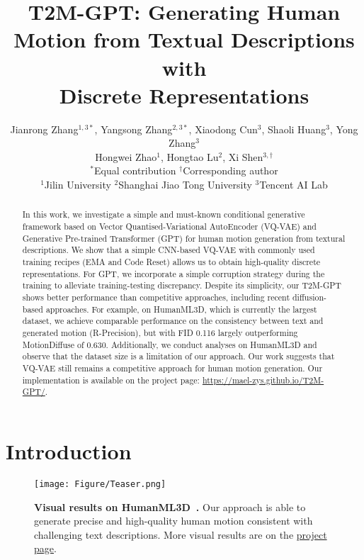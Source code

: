 \documentclass[10pt,twocolumn,letterpaper]{article}
\begin{document}
\title{T2M-GPT: Generating Human Motion from Textual Descriptions with \\ Discrete Representations}

\author{Jianrong Zhang$^{1,3*}$, 
Yangsong Zhang$^{2,3*}$, 
Xiaodong Cun$^3$, Shaoli Huang$^3$, Yong Zhang$^3$ \\ Hongwei Zhao$^1$, Hongtao Lu$^2$, Xi Shen$^{3,\dagger}$ \\
\small $^{*}$Equal contribution \qquad $^{\dagger}$Corresponding author \\[2mm]
$^1$Jilin University \qquad
$^2$Shanghai Jiao Tong University \qquad $^3$Tencent AI Lab\\
}
\maketitle

\begin{abstract}
In this work, we investigate a simple and must-known conditional generative framework based on Vector Quantised-Variational AutoEncoder (VQ-VAE) and Generative Pre-trained Transformer (GPT) for human motion generation from textural descriptions. We show that a simple CNN-based VQ-VAE with commonly used training recipes (EMA and Code Reset) allows us to obtain high-quality discrete representations. For GPT, we incorporate a simple corruption strategy during the training to alleviate training-testing discrepancy. Despite its simplicity, our T2M-GPT shows better performance than competitive approaches, including recent diffusion-based approaches. For example, on HumanML3D, which is currently the largest dataset, we achieve comparable performance on the consistency between text and generated motion (R-Precision), but with FID 0.116 largely outperforming MotionDiffuse of 0.630. Additionally, we conduct analyses on HumanML3D and observe that the dataset size is a limitation of our approach. Our work suggests that VQ-VAE still remains a competitive approach for human motion generation. Our implementation is available on the project page: \url{https://mael-zys.github.io/T2M-GPT/}.
\end{abstract}


\section{Introduction}
\label{sec:intro}
\begin{figure}[tp]
    \centering
    \texttt{[image: Figure/Teaser.png]}
    \caption{\textbf{Visual results on HumanML3D~\cite{guo2022generating}.} Our approach is able to generate precise and high-quality human motion consistent with challenging text descriptions. More visual results are on the \href{https://mael-zys.github.io/T2M-GPT/}{project page}.}
    \label{fig:teaser}
\end{figure}
\end{document}
